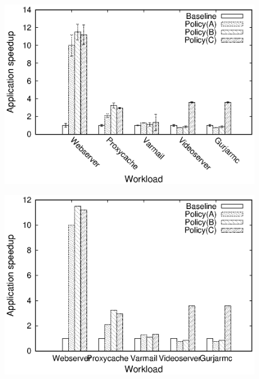 \documentclass[a4paper, 10pt]{report}
\begin{document}
\begin{figure}
\centering

\includegraphics[width=\columnwidth]{speedup_errorbar.eps}
 \label{fig:figr3}
\end{figure}

\begin{figure}
\centering
\includegraphics[width=\columnwidth]{speedup.eps}
 \label{fig:figr4}
\end{figure}
\end{document}

